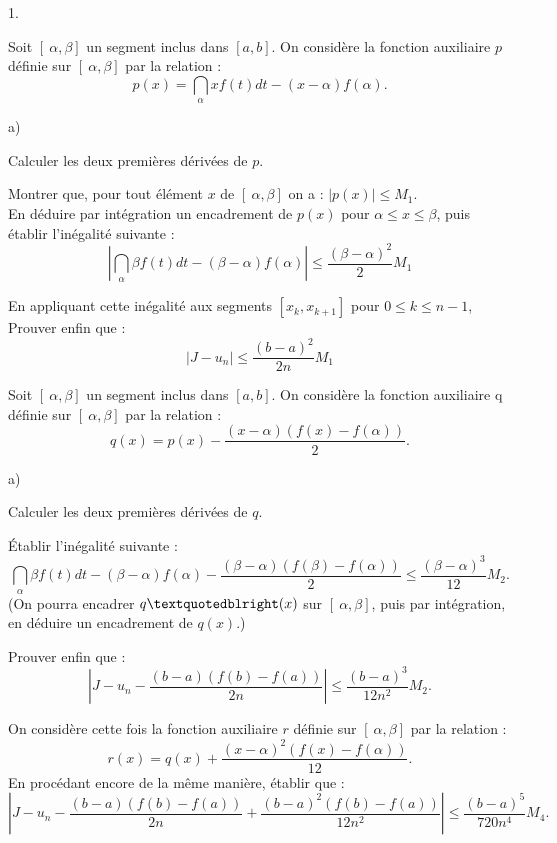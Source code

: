\documentclass[11pt]{article}%
\begin{document}
\begin{noliste}{1.}
 \setlength{\itemsep}{4mm}
\item Soit $[ \ \alpha,\beta ]$ un segment inclus dans $[a,b]$. On
considère
la fonction auxiliaire $p$ définie sur $[ \ \alpha,\beta ]$ par la
relation : 
\[
p(x) = \dint\limits_{\alpha }{x}f(t)dt-(x-\alpha )f(\alpha ).
\]

\begin{noliste}{a)}
 \setlength{\itemsep}{2mm}
\item Calculer les deux premières dérivées de $p$.

\item Montrer que, pour tout élément $x$ de $[ \ \alpha,\beta ]$ on a :
$\left| p(x)\right| \leq M_{1}$.\\
En déduire par intégration un encadrement de $p(x)$ pour $\alpha \leq
x\leq \beta $, puis établir l'inégalité suivante :
\[
\left| \dint\limits_{\alpha }{\beta }f(t)dt-(\beta -\alpha )f(\alpha
)\right| \leq \dfrac{(\beta -\alpha )^{2}}{2}M_{1}
\]

\item En appliquant cette inégalité aux segments $[x_{k},x_{k + 1}]$
pour $0\leq k\leq n-1$, Prouver enfin que :
\[
\left| J-u_{n}\right| \leq \dfrac{(b-a)^{2}}{2n}M_{1}
\]
\end{noliste}

\item Soit $[ \ \alpha,\beta ]$ un segment inclus dans $[a,b]$. On
considère
la fonction auxiliaire q définie sur $[ \ \alpha,\beta ]$ par la
relation :
\[
q(x) = p(x)-\dfrac{(x-\alpha )(f(x)-f(\alpha ))}{2}.
\]

\begin{noliste}{a)}
 \setlength{\itemsep}{2mm}
\item Calculer les deux premières dérivées de $q$.

\item Établir l'inégalité suivante :
\[
\dint\limits_{\alpha }{\beta }f(t)dt-(\beta -\alpha )f(\alpha
)-\dfrac{(\beta -\alpha )(f(\beta )-f(\alpha ))}{2}\leq \dfrac{(\beta
-\alpha
)^{3}}{12}M_{2}.
\]
(On pourra encadrer $q\textquotedblright (x)$ sur $[ \ \alpha,\beta ]$,
puis
par intégration, en déduire un encadrement de $q(x)$.)

\item Prouver enfin que :
\[
\left| J-u_{n}-\dfrac{(b-a)(f(b)-f(a))}{2n}\right| \leq
\dfrac{(b-a)^{3}}{12n^{2}}M_{2}.
\]
\end{noliste}

\item On considère cette fois la fonction auxiliaire $r$ définie sur $[
\ \alpha,\beta ]$ par la relation :
\[
r(x) = q(x) + \dfrac{(x-\alpha )^{2}(f(x)-f(\alpha ))}{12}.
\]
En procédant encore de la même manière, établir que :
\[
\left| J-u_{n}-\dfrac{(b-a)(f(b)-f(a))}{2n} +
\dfrac{(b-a)^{2}(f(b)-f(a))}{12n^{2}}\right| \leq
\dfrac{(b-a)^{5}}{720n^{4}}M_{4}.
\]


\end{noliste}
\end{document}
